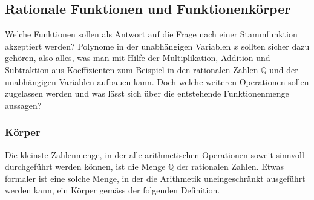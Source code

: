 %
%
%
\subsection{Rationale Funktionen und Funktionenkörper
\label{buch:integral:subsection:rational}}
Welche Funktionen sollen als Antwort auf die Frage nach einer Stammfunktion
akzeptiert werden?
Polynome in der unabhängigen Variablen $x$ sollten sicher dazu gehören,
also alles, was man mit Hilfe der Multiplikation, Addition und Subtraktion
aus Koeffizienten zum Beispiel in den rationalen Zahlen $\mathbb{Q}$ und
der unabhängigen Variablen aufbauen kann.
Doch welche weiteren Operationen sollen zugelassen werden und was lässt
sich über die entstehende Funktionenmenge aussagen?

%
%
\subsubsection{Körper}
Die kleinste Zahlenmenge, in der alle arithmetischen Operationen soweit
sinnvoll durchgeführt werden können, ist die Menge $\mathbb{Q}$ der
rationalen Zahlen.
Etwas formaler ist eine solche Menge, in der die Arithmetik uneingeschränkt
ausgeführt werden kann, ein Körper gemäss der folgenden Definition.
%

